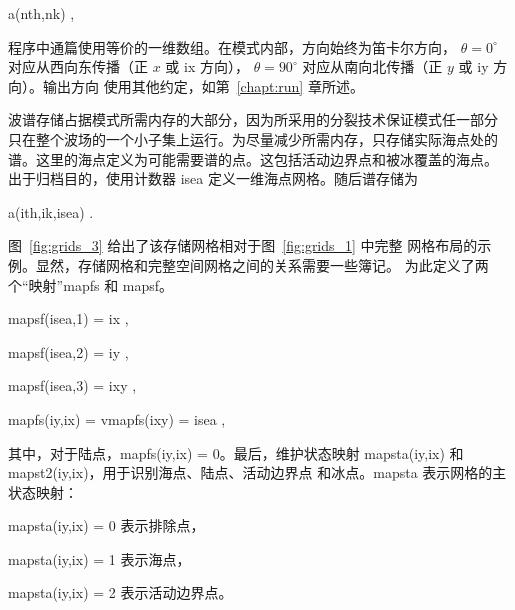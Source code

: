 \vspace{\baselineskip}
\centerline{\F a(nth,nk) ,}
\vspace{\baselineskip}

\noindent
程序中通篇使用等价的一维数组。在模式内部，方向始终为笛卡尔方向，
$\theta = 0^\circ$ 对应从西向东传播（正 $x$ 或 {\F ix} 方向），
$\theta = 90^\circ$ 对应从南向北传播（正 $y$ 或 {\F iy} 方向）。输出方向
使用其他约定，如第~\ref{chapt:run} 章所述。

波谱存储占据模式所需内存的大部分，因为所采用的分裂技术保证模式任一部分
只在整个波场的一个小子集上运行。为尽量减少所需内存，只存储实际海点处的
谱。这里的海点定义为可能需要谱的点。这包括活动边界点和被冰覆盖的海点。
出于归档目的，使用计数器 {\F isea} 定义一维海点网格。随后谱存储为

\vspace{\baselineskip}
\centerline{\F a(ith,ik,isea) .}
\vspace{\baselineskip}

\noindent
图~\ref{fig:grids_3} 给出了该存储网格相对于图~\ref{fig:grids_1} 中完整
网格布局的示例。显然，存储网格和完整空间网格之间的关系需要一些簿记。
为此定义了两个“映射”{\F mapfs} 和 {\F mapsf}。

\vspace{\baselineskip}
\centerline{\F mapsf(isea,1) = ix ,}
\centerline{\F mapsf(isea,2) = iy ,}
\centerline{\F mapsf(isea,3) = ixy ,}
\centerline{\F mapfs(iy,ix) = vmapfs(ixy) = isea ,}
\vspace{\baselineskip}




\noindent
其中，对于陆点，{\F mapfs(iy,ix) = 0}。最后，维护状态映射
{\F mapsta(iy,ix)} 和 {\F mapst2(iy,ix)}，用于识别海点、陆点、活动边界点
和冰点。{\F mapsta} 表示网格的主状态映射：

\vspace{\baselineskip} \noindent
\strut \hspace{25mm} {\F mapsta(iy,ix) = 0} \hspace{10mm} 表示排除点，\\
\strut \hspace{25mm} {\F mapsta(iy,ix) = 1} \hspace{10mm} 表示海点，\\
\strut \hspace{25mm} {\F mapsta(iy,ix) = 2} \hspace{10mm} 表示活动边界点。

\vspace{\baselineskip}

